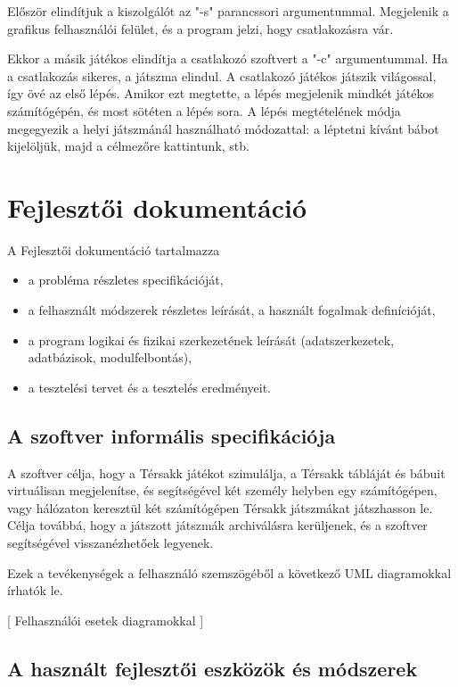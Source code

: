 \documentclass[12pt, twoside]{report}
\begin{document}
Először elindítjuk a kiszolgálót az "-s" parancssori argumentummal. Megjelenik a grafikus felhasználói felület, és a program jelzi, hogy csatlakozásra vár.

Ekkor a másik játékos elindítja a csatlakozó szoftvert a "-c" argumentummal. Ha a csatlakozás sikeres, a játszma elindul. A csatlakozó játékos játszik világossal, így övé az első lépés. Amikor ezt megtette, a lépés megjelenik mindkét játékos számítógépén, és most sötéten a lépés sora. A lépés megtételének módja megegyezik a helyi játszmánál használható módozattal: a léptetni kívánt bábot kijelöljük, majd a célmezőre kattintunk, stb.

\chapter{Fejlesztői dokumentáció}

A Fejlesztői dokumentáció tartalmazza 
\begin{itemize}
\item a probléma részletes specifikációját, 
\item a felhasznált módszerek részletes leírását, a használt fogalmak definícióját,
\item a program logikai és fizikai szerkezetének leírását (adatszerkezetek, adatbázisok, modulfelbontás),
\item a tesztelési tervet és a tesztelés eredményeit.
\end{itemize}


\section{A szoftver informális specifikációja}

A szoftver célja, hogy a Térsakk játékot szimulálja, a Térsakk tábláját és bábuit virtuálisan megjelenítse, és segítségével két személy helyben egy számítógépen, vagy hálózaton keresztül két számítógépen Térsakk játszmákat játszhasson le. Célja továbbá, hogy a játszott játszmák archiválásra kerüljenek, és a szoftver segítségével visszanézhetőek legyenek.

Ezek a tevékenységek a felhasználó szemszögéből a következő UML diagramokkal írhatók le.

[ Felhasználói esetek diagramokkal ]

\section{A használt fejlesztői eszközök és módszerek}
\end{document}

